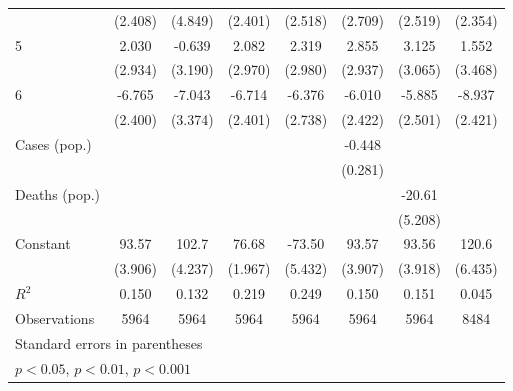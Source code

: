 \documentclass{article}
\begin{document}
{\begin{longtable}{l*{7}{c}}
                &  (2.408)         &  (4.849)         &  (2.401)         &  (2.518)         &  (2.709)         &  (2.519)         &  (2.354)         \\
5               &    2.030         &   -0.639         &    2.082         &    2.319         &    2.855         &    3.125         &    1.552         \\
                &  (2.934)         &  (3.190)         &  (2.970)         &  (2.980)         &  (2.937)         &  (3.065)         &  (3.468)         \\
6               &   -6.765\sym{**} &   -7.043\sym{*}  &   -6.714\sym{**} &   -6.376\sym{*}  &   -6.010\sym{*}  &   -5.885\sym{*}  &   -8.937\sym{***}\\
                &  (2.400)         &  (3.374)         &  (2.401)         &  (2.738)         &  (2.422)         &  (2.501)         &  (2.421)         \\
Cases (pop.)    &                  &                  &                  &                  &   -0.448         &                  &                  \\
                &                  &                  &                  &                  &  (0.281)         &                  &                  \\
Deaths (pop.)   &                  &                  &                  &                  &                  &   -20.61\sym{***}&                  \\
                &                  &                  &                  &                  &                  &  (5.208)         &                  \\
Constant        &    93.57\sym{***}&    102.7\sym{***}&    76.68\sym{***}&   -73.50\sym{***}&    93.57\sym{***}&    93.56\sym{***}&    120.6\sym{***}\\
                &  (3.906)         &  (4.237)         &  (1.967)         &  (5.432)         &  (3.907)         &  (3.918)         &  (6.435)         \\
\hline
\(R^{2}\)       &    0.150         &    0.132         &    0.219         &    0.249         &    0.150         &    0.151         &    0.045         \\
Observations    &     5964         &     5964         &     5964         &     5964         &     5964         &     5964         &     8484         \\
\hline\hline
\multicolumn{8}{l}{\footnotesize Standard errors in parentheses}\\
\multicolumn{8}{l}{\footnotesize \sym{*} \(p<0.05\), \sym{**} \(p<0.01\), \sym{***} \(p<0.001\)}\\
\end{longtable}
}
\end{document}
